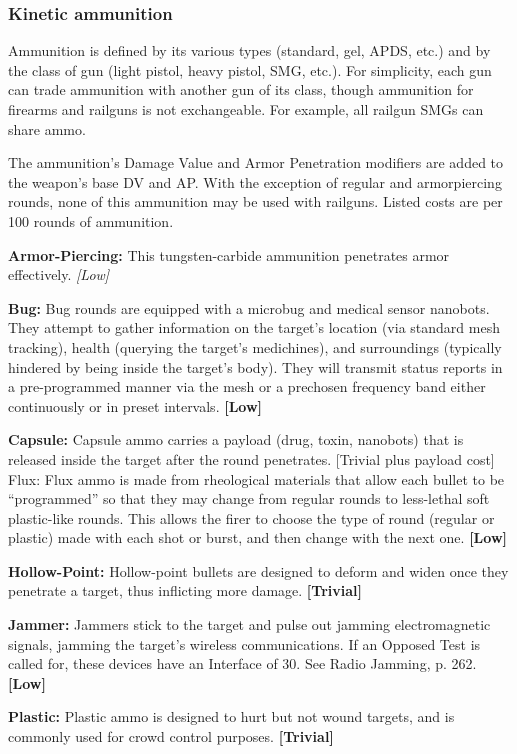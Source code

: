 \subsubsection{Kinetic ammunition} 

Ammunition is defined by its various types (standard, gel, APDS, etc.) and by the class of gun (light pistol, heavy pistol, SMG, etc.). For simplicity, each gun can trade ammunition with another gun of its class, though ammunition for firearms and railguns is not exchangeable. For example, all railgun SMGs can share ammo. 

The ammunition’s Damage Value and Armor Penetration modifiers are added to the weapon’s base DV and AP. With the exception of regular and armorpiercing rounds, none of this ammunition may be used with railguns. Listed costs are per 100 rounds of ammunition. 

\textbf{Armor-Piercing:} This tungsten-carbide ammunition penetrates armor effectively. \textit{[Low]} 

\textbf{Bug:} Bug rounds are equipped with a microbug and medical sensor nanobots. They attempt to gather information on the target’s location (via standard mesh tracking), health (querying the target’s medichines), and surroundings (typically hindered by being inside the target’s body). They will transmit status reports in a pre-programmed manner via the mesh or a prechosen frequency band either continuously or in preset intervals. \textbf{[Low]} 

\textbf{Capsule:} Capsule ammo carries a payload (drug, toxin, nanobots) that is released inside the target after the round penetrates. [Trivial plus payload cost] Flux: Flux ammo is made from rheological materials that allow each bullet to be ``programmed'' so that they may change from regular rounds to less-lethal soft plastic-like rounds. This allows the firer to choose the type of round (regular or plastic) made with each shot or burst, and then change with the next one. \textbf{[Low]} 

\textbf{Hollow-Point:} Hollow-point bullets are designed to deform and widen once they penetrate a target, thus inflicting more damage. \textbf{[Trivial]} 

\textbf{Jammer:} Jammers stick to the target and pulse out jamming electromagnetic signals, jamming the target’s wireless communications. If an Opposed Test is called for, these devices have an Interface of 30. See Radio Jamming, p. 262. \textbf{[Low]} 

\textbf{Plastic:} Plastic ammo is designed to hurt but not wound targets, and is commonly used for crowd control purposes. \textbf{[Trivial]} 


